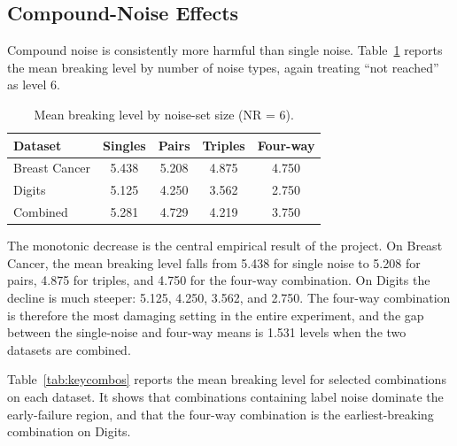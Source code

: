 \subsection{Compound-Noise Effects}

Compound noise is consistently more harmful than single noise. Table~\ref{tab:compoundbp} reports the mean breaking level by number of noise types, again treating ``not reached'' as level 6.

\begin{table}[H]
\centering
\caption{Mean breaking level by noise-set size (NR = 6).}
\label{tab:compoundbp}
\small
\begin{tabular}{lcccc}
\toprule
\textbf{Dataset} & \textbf{Singles} & \textbf{Pairs} & \textbf{Triples} & \textbf{Four-way} \\
\midrule
Breast Cancer & 5.438 & 5.208 & 4.875 & 4.750 \\
Digits & 5.125 & 4.250 & 3.562 & 2.750 \\
Combined & 5.281 & 4.729 & 4.219 & 3.750 \\
\bottomrule
\end{tabular}
\end{table}

The monotonic decrease is the central empirical result of the project. On Breast Cancer, the mean breaking level falls from 5.438 for single noise to 5.208 for pairs, 4.875 for triples, and 4.750 for the four-way combination. On Digits the decline is much steeper: 5.125, 4.250, 3.562, and 2.750. The four-way combination is therefore the most damaging setting in the entire experiment, and the gap between the single-noise and four-way means is 1.531 levels when the two datasets are combined.

Table~\ref{tab:keycombos} reports the mean breaking level for selected combinations on each dataset. It shows that combinations containing label noise dominate the early-failure region, and that the four-way combination is the earliest-breaking combination on Digits.

